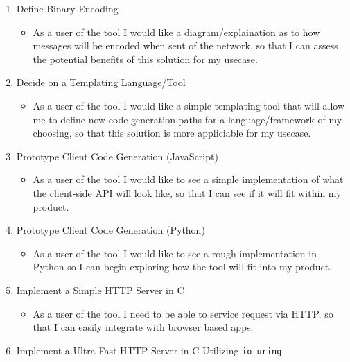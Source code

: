 \documentclass[11pt]{article}
\begin{document}
\begin{enumerate}
\begin{itemize}
\end{itemize}
\item Define Binary Encoding\\
\begin{itemize}
\item As a user of the tool I would like a diagram/explaination as to how messages will be encoded when sent of the network, so that I can assess the potential benefits of this solution for my usecase.\\
\end{itemize}
\item Decide on a Templating Language/Tool\\
\begin{itemize}
\item As a user of the tool I would like a simple templating tool that will allow me to define now code generation paths for a language/framework of my choosing, so that this solution is more appliciable for my usecase.\\
\end{itemize}
\item Prototype Client Code Generation (JavaScript)\\
\begin{itemize}
\item As a user of the tool I would like to see a simple implementation of what the client-side API will look like, so that I can see if it will fit within my product.\\
\end{itemize}
\item Prototype Client Code Generation (Python)\\
\begin{itemize}
\item As a user of the tool I would like to see a rough implementation in Python so I can begin exploring how the tool will fit into my product.\\
\end{itemize}
\item Implement a Simple HTTP Server in C\\
\begin{itemize}
\item As a user of the tool I need to be able to service request via HTTP, so that I can easily integrate with browser based apps.\\
\end{itemize}
\item Implement a Ultra Fast HTTP Server in C Utilizing \texttt{io\_uring}\\

\end{enumerate}
\end{document}
